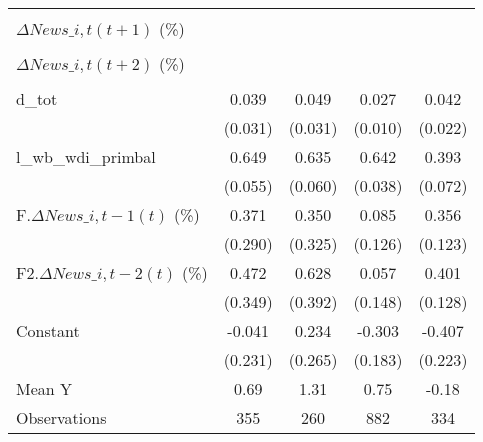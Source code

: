{\begin{tabular}{l*{4}{c}}
                    &                     &                     &                     &                     \\
\addlinespace
$ \Delta News\_{i,t}(t+1)$ (\%)&                     &                     &                     &                     \\
                    &                     &                     &                     &                     \\
\addlinespace
$ \Delta News\_{i,t}(t+2)$ (\%)&                     &                     &                     &                     \\
                    &                     &                     &                     &                     \\
\addlinespace
d\_tot               &       0.039         &       0.049         &       0.027\sym{**} &       0.042\sym{*}  \\
                    &     (0.031)         &     (0.031)         &     (0.010)         &     (0.022)         \\
\addlinespace
l\_wb\_wdi\_primbal    &       0.649\sym{***}&       0.635\sym{***}&       0.642\sym{***}&       0.393\sym{***}\\
                    &     (0.055)         &     (0.060)         &     (0.038)         &     (0.072)         \\
\addlinespace
F.$ \Delta News\_{i,t-1}(t)$ (\%)&       0.371         &       0.350         &       0.085         &       0.356\sym{***}\\
                    &     (0.290)         &     (0.325)         &     (0.126)         &     (0.123)         \\
\addlinespace
F2.$ \Delta News\_{i,t-2}(t)$ (\%)&       0.472         &       0.628         &       0.057         &       0.401\sym{***}\\
                    &     (0.349)         &     (0.392)         &     (0.148)         &     (0.128)         \\
\addlinespace
Constant            &      -0.041         &       0.234         &      -0.303         &      -0.407\sym{*}  \\
                    &     (0.231)         &     (0.265)         &     (0.183)         &     (0.223)         \\
\midrule
Mean Y              &        0.69         &        1.31         &        0.75         &       -0.18         \\
Observations        &         355         &         260         &         882         &         334         \\
\bottomrule
\end{tabular}
}
